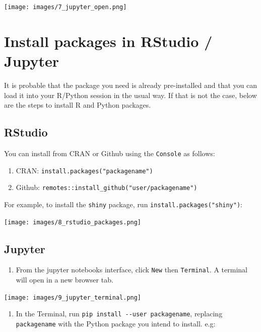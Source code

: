 \documentclass[]{book}
\providecommand{\tightlist}{%
  \setlength{\itemsep}{0pt}\setlength{\parskip}{0pt}}
\begin{document}
\texttt{[image: images/7\_jupyter\_open.png]}

\hypertarget{install-packages-in-rstudio-jupyter}{%
\chapter*{Install packages in RStudio / Jupyter}\label{install-packages-in-rstudio-jupyter}}

It is probable that the package you need is already pre-installed and that you can load it into your R/Python session in the usual way. If that is not the case, below are the steps to install R and Python packages.

\hypertarget{rstudio-1}{%
\section{RStudio}\label{rstudio-1}}

You can install from CRAN or Github using the \texttt{Console} as follows:

\begin{enumerate}
\def\labelenumi{\arabic{enumi}.}
\tightlist
\item
  CRAN: \texttt{install.packages("packagename")}
\item
  Github: \texttt{remotes::install\_github("user/packagename")}
\end{enumerate}

For example, to install the \texttt{shiny} package, run \texttt{install.packages("shiny")}:

\texttt{[image: images/8\_rstudio\_packages.png]}

\hypertarget{jupyter-1}{%
\section{Jupyter}\label{jupyter-1}}

\begin{enumerate}
\def\labelenumi{\arabic{enumi}.}
\tightlist
\item
  From the jupyter notebooks interface, click \texttt{New} then \texttt{Terminal}. A terminal will open in a new browser tab.
\end{enumerate}

\texttt{[image: images/9\_jupyter\_terminal.png]}

\begin{enumerate}
\def\labelenumi{\arabic{enumi}.}
\setcounter{enumi}{1}
\tightlist
\item
  In the Terminal, run \texttt{pip\ install\ -\/-user\ packagename}, replacing \texttt{packagename} with the Python package you intend to install. e.g:
\end{enumerate}
\end{document}
